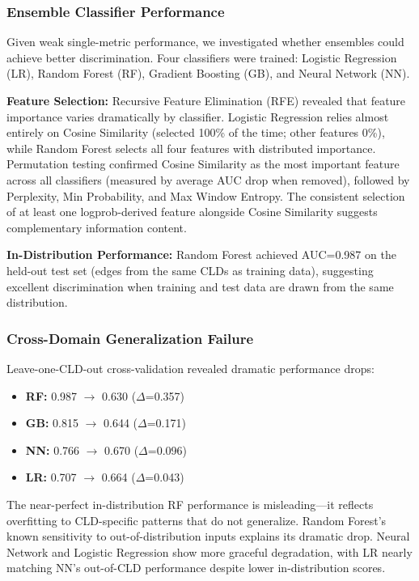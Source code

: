 \subsubsection{Ensemble Classifier Performance}

Given weak single-metric performance, we investigated whether ensembles could achieve better discrimination. Four classifiers were trained: Logistic Regression (LR), Random Forest (RF), Gradient Boosting (GB), and Neural Network (NN).

\textbf{Feature Selection:} Recursive Feature Elimination (RFE) revealed that feature importance varies dramatically by classifier. Logistic Regression relies almost entirely on Cosine Similarity (selected 100\% of the time; other features 0\%), while Random Forest selects all four features with distributed importance. Permutation testing confirmed Cosine Similarity as the most important feature across all classifiers (measured by average AUC drop when removed), followed by Perplexity, Min Probability, and Max Window Entropy. The consistent selection of at least one logprob-derived feature alongside Cosine Similarity suggests complementary information content.

\textbf{In-Distribution Performance:} Random Forest achieved AUC=0.987 on the held-out test set (edges from the same CLDs as training data), suggesting excellent discrimination when training and test data are drawn from the same distribution.

\subsubsection{Cross-Domain Generalization Failure}

Leave-one-CLD-out cross-validation revealed dramatic performance drops:
\begin{itemize}[noitemsep]
    \item \textbf{RF:} 0.987 $\rightarrow$ 0.630 ($\Delta$=0.357)
    \item \textbf{GB:} 0.815 $\rightarrow$ 0.644 ($\Delta$=0.171)
    \item \textbf{NN:} 0.766 $\rightarrow$ 0.670 ($\Delta$=0.096)
    \item \textbf{LR:} 0.707 $\rightarrow$ 0.664 ($\Delta$=0.043)
\end{itemize}

The near-perfect in-distribution RF performance is misleading---it reflects overfitting to CLD-specific patterns that do not generalize. Random Forest's known sensitivity to out-of-distribution inputs explains its dramatic drop. Neural Network and Logistic Regression show more graceful degradation, with LR nearly matching NN's out-of-CLD performance despite lower in-distribution scores.

